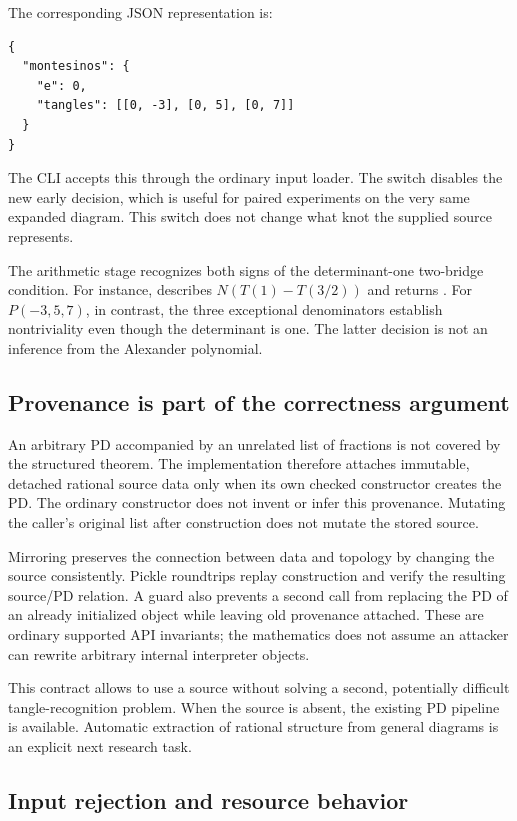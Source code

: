 The corresponding JSON representation is:
\begin{lstlisting}
{
  "montesinos": {
    "e": 0,
    "tangles": [[0, -3], [0, 5], [0, 7]]
  }
}
\end{lstlisting}
The CLI accepts this through the ordinary input loader. The switch
 disables the new early decision, which is useful for
paired experiments on the very same expanded diagram. This switch does not
change what knot the supplied source represents.

The arithmetic stage recognizes both signs of the determinant-one
two-bridge condition. For instance,
describes \(N(T(1)-T(3/2))\) and returns \unk.
For \(P(-3,5,7)\), in contrast, the three exceptional denominators establish
nontriviality even though the determinant is one. The latter decision is
not an inference from the Alexander polynomial.

\subsection{Provenance is part of the correctness argument}

An arbitrary PD accompanied by an unrelated list of fractions is not
covered by the structured theorem. The implementation therefore attaches
immutable, detached rational source data only when its own checked
constructor creates the PD. The ordinary  constructor
does not invent or infer this provenance. Mutating the caller's original
list after construction does not mutate the stored source.

Mirroring preserves the connection between data and topology by changing
the source consistently. Pickle roundtrips replay construction and verify
the resulting source/PD relation. A guard also prevents a second
 call from replacing the PD of an already initialized
object while leaving old provenance attached. These are ordinary supported
API invariants; the mathematics does not assume an attacker can rewrite
arbitrary internal interpreter objects.

This contract allows  to use a source without solving a
second, potentially difficult tangle-recognition problem. When the source
is absent, the existing PD pipeline is available. Automatic extraction of
rational structure from general diagrams is an explicit next research task.

\subsection{Input rejection and resource behavior}

